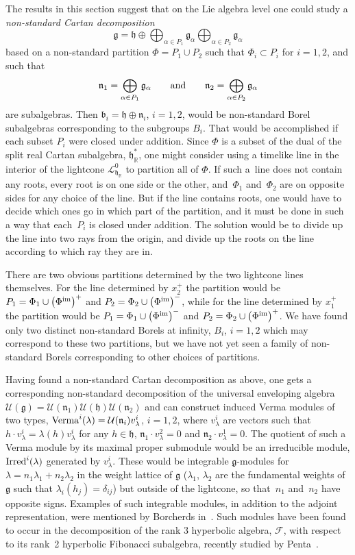 \documentclass[pdftex]{sigma}
\numberwithin{equation}{section}
\def\R{\mathbb{R}}
\def\a{\alpha}
\def\cF{\mathcal F}
\def\cL{\mathcal L}
\def\cU{\mathcal U}
\def\fb{\mathfrak{b}}
\def\fg{\mathfrak{g}}
\def\fh{\mathfrak{h}}
\def\fn{\mathfrak{n}}
\begin{document}
The results in this section suggest that on the Lie algebra level one could study a {\em non-standard Cartan decomposition}
\[\fg = \fh \oplus \bigoplus_{\a\in P_1} \fg_\a \bigoplus_{\a\in P_2} \fg_\a \]
based on a non-standard partition $\Phi = P_1 \cup P_2$ such that $\Phi_i \subset P_i$ for $i=1,2$, and such that
\[\fn_1 = \bigoplus_{\a\in P_1} \fg_\a \qquad \hbox{and}\qquad \fn_2 = \bigoplus_{\a\in P_2} \fg_\a\]
are subalgebras. Then $\fb_i = \fh\oplus\fn_i$, $i=1,2$, would be non-standard Borel subalgebras corresponding to the subgroups
$B_i$. That would be accomplished if each subset $P_i$ were closed under addition.
Since $\Phi$ is a subset of the dual of the split real Cartan subalgebra, $\fh_\R^*$, one might consider using a timelike line in the interior of the lightcone $\cL_{\fh_\R}^0$ to partition all of $\Phi$. If such a~line does not contain any roots, every root is on one side or the other, and~$\Phi_1$ and~$\Phi_2$ are on opposite sides for any choice of the line. But if the line contains
roots, one would have to decide which ones go in which part of the partition, and it must be done in such a way that each~$P_i$ is closed under addition. The solution would be to divide up the line into two rays from the origin, and divide up the roots on the line according to which ray they are in.

There are two obvious partitions determined by the two lightcone lines themselves. For the line determined by $x^+_2$ the partition would be $P_1 = \Phi_1 \cup \big(\Phi^{\rm im}\big)^+$ and $P_2 = \Phi_2 \cup \big(\Phi^{\rm im}\big)^-$, while for the line determined by $x^+_1$ the partition would be $P_1 = \Phi_1 \cup \big(\Phi^{\rm im}\big)^-$ and $P_2 = \Phi_2 \cup \big(\Phi^{\rm im}\big)^+$. We have found only two distinct non-standard Borels at infinity, $B_i$, $i = 1,2$ which may correspond to these two partitions, but we have not yet seen a family of non-standard Borels corresponding to
other choices of partitions.

Having found a non-standard Cartan decomposition as above, one gets a corresponding non-standard decomposition of the universal enveloping algebra $\cU(\fg) = \cU(\fn_1)\cU(\fh)\cU(\fn_2)$ and can construct induced Verma modules of two types,
${\rm Verma}^i(\lambda) = \cU(\fn_i)v^i_\lambda$, $i=1,2$, where $v^i_\lambda$ are vectors such that
$h\cdot v_\lambda^i = \lambda(h) v_\lambda^i$ for any $h\in\fh$, $\fn_1\cdot v^2_\lambda = 0$ and $\fn_2\cdot v^1_\lambda = 0$.
The quotient of such a Verma module by its maximal proper submodule would be an irreducible module, ${\rm Irred}^i(\lambda)$ generated by $v^i_\lambda$. These would be integrable $\fg$-modules for $\lambda = n_1\lambda_1 + n_2\lambda_2$ in the weight lattice of $\fg$ ($\lambda_1$, $\lambda_2$ are the fundamental weights of $\fg$ such that $\lambda_i(h_j) = \delta_{ij}$) but outside of the lightcone, so that~$n_1$ and~$n_2$ have opposite signs. Examples of such integrable modules, in addition to the adjoint representation, were mentioned by
Borcherds in~\cite[Section~6]{Borcherds86}.
Such modules have been found to occur in the decomposition of the rank 3 hyperbolic algebra,
$\cF$, with respect to its rank~2 hyperbolic Fibonacci subalgebra, recently studied by Penta~\cite{Penta16}.
\end{document}
